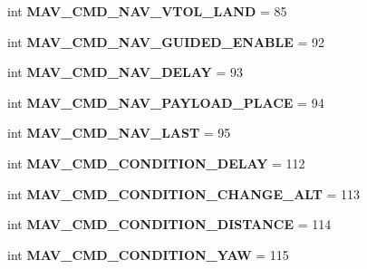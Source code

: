 \begin{DoxyCompactItemize}
int {\bfseries M\+A\+V\+\_\+\+C\+M\+D\+\_\+\+N\+A\+V\+\_\+\+V\+T\+O\+L\+\_\+\+L\+A\+ND} = 85
\item 
\mbox{\label{namespacepymavlink_1_1dialects_1_1v10_a15a441226d0eb8a0dd8e54617d275e4d}} 
int {\bfseries M\+A\+V\+\_\+\+C\+M\+D\+\_\+\+N\+A\+V\+\_\+\+G\+U\+I\+D\+E\+D\+\_\+\+E\+N\+A\+B\+LE} = 92
\item 
\mbox{\label{namespacepymavlink_1_1dialects_1_1v10_adaaf36c0c2e2a9d798ab39f7f76a7ab6}} 
int {\bfseries M\+A\+V\+\_\+\+C\+M\+D\+\_\+\+N\+A\+V\+\_\+\+D\+E\+L\+AY} = 93
\item 
\mbox{\label{namespacepymavlink_1_1dialects_1_1v10_a8a898790e4ec271bf073f0bad9e97126}} 
int {\bfseries M\+A\+V\+\_\+\+C\+M\+D\+\_\+\+N\+A\+V\+\_\+\+P\+A\+Y\+L\+O\+A\+D\+\_\+\+P\+L\+A\+CE} = 94
\item 
\mbox{\label{namespacepymavlink_1_1dialects_1_1v10_a5d35b9a52b763039d5fdd0289091960e}} 
int {\bfseries M\+A\+V\+\_\+\+C\+M\+D\+\_\+\+N\+A\+V\+\_\+\+L\+A\+ST} = 95
\item 
\mbox{\label{namespacepymavlink_1_1dialects_1_1v10_af9b8175770193e811593f83e1d600d38}} 
int {\bfseries M\+A\+V\+\_\+\+C\+M\+D\+\_\+\+C\+O\+N\+D\+I\+T\+I\+O\+N\+\_\+\+D\+E\+L\+AY} = 112
\item 
\mbox{\label{namespacepymavlink_1_1dialects_1_1v10_af644697f0884dc5d0d84aa7a46c30f71}} 
int {\bfseries M\+A\+V\+\_\+\+C\+M\+D\+\_\+\+C\+O\+N\+D\+I\+T\+I\+O\+N\+\_\+\+C\+H\+A\+N\+G\+E\+\_\+\+A\+LT} = 113
\item 
\mbox{\label{namespacepymavlink_1_1dialects_1_1v10_aa134534d1ece190857f9e71be948ad6d}} 
int {\bfseries M\+A\+V\+\_\+\+C\+M\+D\+\_\+\+C\+O\+N\+D\+I\+T\+I\+O\+N\+\_\+\+D\+I\+S\+T\+A\+N\+CE} = 114
\item 
\mbox{\label{namespacepymavlink_1_1dialects_1_1v10_a0dd13bd7c31f717b8e4fc95c0dd228ef}} 
int {\bfseries M\+A\+V\+\_\+\+C\+M\+D\+\_\+\+C\+O\+N\+D\+I\+T\+I\+O\+N\+\_\+\+Y\+AW} = 115

\end{DoxyCompactItemize}
